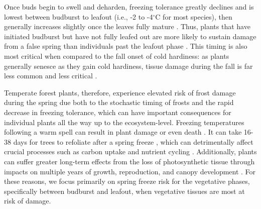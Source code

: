 \documentclass{article}\usepackage[]{graphicx}\usepackage[]{color}
\begin{document}
Once buds begin to swell and deharden, freezing tolerance greatly declines and is lowest between budburst to leafout (i.e., -2 to -4$^{\circ}$C for most species), then generally increases slightly once the leaves fully mature \citep[i.e., at this stage most species can sustain temperatures at least 1-4$^{\circ}$C lower than they can between budburst to leafout,][]{Sakai1987, Lenz2013}. Thus, plants that have initiated budburst but have not fully leafed out are more likely to sustain damage from a false spring than individuals past the leafout phase \citep{Lenz2016}. This timing is also most critical when compared to the fall onset of cold hardiness: as plants generally senesce as they gain cold hardiness, tissue damage during the fall is far less common and less critical \citep{Estiarte2015, Liu2018}.  

Temperate forest plants, therefore, experience elevated risk of frost damage during the spring due both to the stochastic timing of frosts and the rapid decrease in freezing tolerance, which can have important consequences for individual plants all the way up to the ecosystem-level. Freezing temperatures following a warm spell can result in plant damage or even death \citep{Ludlum1968, Mock2007}. It can take 16-38 days for trees to refoliate after a spring freeze \citep{Augspurger2009, Augspurger2013, Gu2008, Menzel2015}, which can detrimentally affect crucial processes such as carbon uptake and nutrient cycling \citep{Hufkens2012, Klosterman2018, Richardson2013}. Additionally, plants can suffer greater long-term effects from the loss of photosynthetic tissue through impacts on multiple years of growth, reproduction, and canopy development \citep{Vitasse2014, Xie2015}.  For these reasons, we focus primarily on spring freeze risk for the vegetative phases, specifically between budburst and leafout, when vegetative tissues are most at risk of damage.
\end{document}
